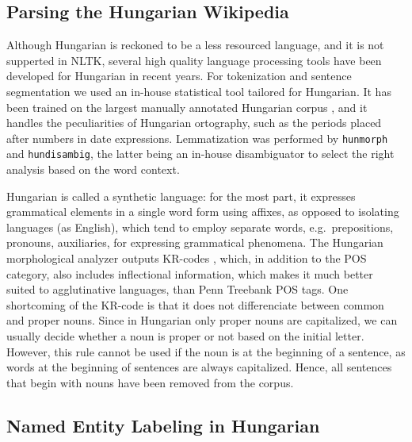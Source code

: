 \documentclass[11pt]{article}
\begin{document}
\subsection{Parsing the Hungarian Wikipedia}

Although Hungarian is reckoned to be a less resourced language, and it is not supperted in NLTK, several high quality language processing tools have been developed for Hungarian in recent years. For tokenization and sentence segmentation we used an in-house statistical tool tailored for Hungarian. It has been trained on the largest manually annotated Hungarian corpus \cite{Csendes:04}, and it handles the peculiarities of Hungarian ortography, such as the periods placed after numbers in date expressions. Lemmatization was performed by \texttt{hunmorph} \cite{Tron:05} and \texttt{hundisambig}, the latter being an in-house disambiguator to select the right analysis based on the word context. 


Hungarian is called a synthetic language: for the most part, it expresses grammatical elements in a single word form using affixes, as opposed to isolating languages (as English), which tend to employ separate words, e.g.~prepositions, pronouns, auxiliaries, for expressing grammatical phenomena. The Hungarian morphological analyzer outputs KR-codes \cite{Kornai:04}, which, in addition to the POS category, also includes inflectional information, which makes it much better suited to agglutinative languages, than Penn Treebank POS tags. One shortcoming of the KR-code is that it does not differenciate between common and proper nouns. Since in Hungarian only proper nouns are capitalized, we can usually decide whether a noun is proper or not based on the initial letter. However, this rule cannot be used if the noun is at the beginning of a sentence, as words at the beginning of sentences are always capitalized. Hence, all sentences that begin with nouns have been removed from the corpus.

\subsection{Named Entity Labeling in Hungarian}
\end{document}
